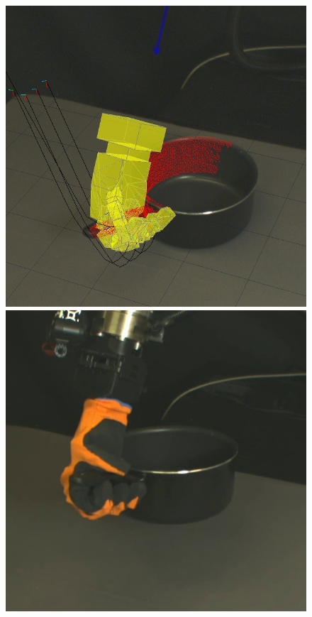 \begin{figure}
\begin{center}
  \includegraphics[width=\tw]{images/experiments/query/saucepanlarge-handle-1-s}
 \includegraphics[width=\tw]{images/experiments/exec/saucepanlarge-handle-s}

\end{center}
\end{figure}

